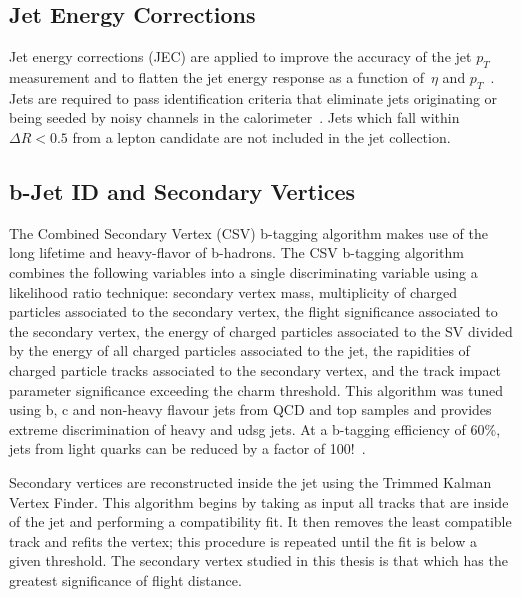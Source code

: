 \subsection{Jet Energy Corrections}
Jet energy corrections (JEC)
are applied to improve the accuracy of the jet $p_{T}$ measurement
and to flatten the jet energy response as a function
of~$\eta$ and $p_{T}$~\cite{jme-10-010}.
Jets are required to pass identification
criteria that eliminate jets originating or being seeded by
noisy channels in the calorimeter~\cite{Chatrchyan:2009hy}.
Jets which fall within $\Delta R < 0.5$ from a lepton candidate
are not included in the jet collection.

\subsection{b-Jet ID and Secondary Vertices}
The Combined Secondary Vertex (CSV) b-tagging algorithm makes use
of the long lifetime and heavy-flavor of b-hadrons.
The CSV b-tagging algorithm combines the following variables into a single discriminating
variable using a likelihood ratio technique: secondary vertex mass, multiplicity of charged
particles associated to the secondary vertex, the flight significance associated to the
secondary vertex, the energy of charged particles associated to the SV divided by the energy
of all charged particles associated to the jet, the rapidities of charged particle tracks associated
to the secondary vertex, and the track impact parameter significance exceeding the charm threshold.
This algorithm was tuned
using b, c and non-heavy flavour jets from QCD and top samples and provides extreme discrimination
of heavy and udsg jets. At a b-tagging efficiency of 60$\%$, jets from light quarks can be reduced
by a factor of 100!~\cite{refCSV}.

Secondary vertices are reconstructed inside the jet using the Trimmed Kalman Vertex Finder.
This algorithm begins by taking as input all tracks that are inside of the jet and performing a compatibility fit. It then removes the least compatible track and refits the vertex; this procedure is repeated until
the fit is below a given threshold. The secondary vertex studied in this thesis is that which has
the greatest significance of flight distance.

